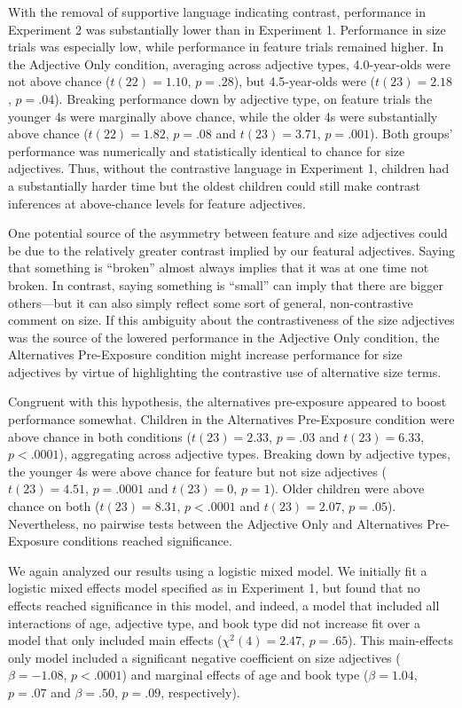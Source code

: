 \documentclass[man]{apa2}
\begin{document}
With the removal of supportive language indicating contrast, performance in Experiment 2 was substantially lower than in Experiment 1. Performance in size trials was especially low, while performance in feature trials remained higher. In the Adjective Only condition, averaging across adjective types, 4.0-year-olds were not above chance ($t(22) = 1.10$, $p = .28$), but 4.5-year-olds were ($t(23)=2.18$, $p = .04$). Breaking performance down by adjective type, on feature trials the younger 4s were marginally above chance, while the older 4s were substantially above chance ($t(22) = 1.82$, $p = .08$ and $t(23)=3.71$, $p = .001$). Both groups' performance was numerically and statistically identical to chance for size adjectives. Thus, without the contrastive language in Experiment 1, children had a substantially harder time but the oldest children could still make contrast inferences at above-chance levels for feature adjectives. 

One potential source of the asymmetry between feature and size adjectives could be due to the relatively greater contrast implied by our featural adjectives. Saying that something is ``broken'' almost always implies that it was at one time not broken. In contrast, saying something is ``small'' can imply that there are bigger others---but it can also simply reflect some sort of general, non-contrastive comment on size. If this ambiguity about the contrastiveness of the size adjectives was the source of the lowered performance in the Adjective Only condition, the Alternatives Pre-Exposure condition might increase performance for size adjectives by virtue of highlighting the contrastive use of alternative size terms. 

Congruent with this hypothesis, the alternatives pre-exposure appeared to boost performance somewhat. Children in the Alternatives Pre-Exposure condition were above chance in both conditions ($t(23) = 2.33$, $p = .03$ and $t(23) = 6.33$, $p < .0001$), aggregating across adjective types. Breaking down by adjective types, the younger 4s were above chance for feature but not size adjectives ($t(23) = 4.51$, $p = .0001$ and $t(23)=0$, $p = 1$). Older children were above chance on both ($t(23) = 8.31$, $p < .0001$ and $t(23)= 2.07$, $p = .05$). Nevertheless, no pairwise tests between the Adjective Only and Alternatives Pre-Exposure conditions reached significance. 

We again analyzed our results using a logistic mixed model. We initially fit a logistic mixed effects model specified as in Experiment 1, but found that no effects reached significance in this model, and indeed, a model that included all interactions of age, adjective type, and book type did not increase fit over a model that only included main effects ($\chi^2(4) = 2.47$, $p = .65$). This main-effects only model included a significant negative coefficient on size adjectives ($\beta = -1.08$, $p < .0001$) and marginal effects of age and book type ($\beta = 1.04$, $p = .07$ and $\beta = .50$, $p = .09$, respectively). 
\end{document}
